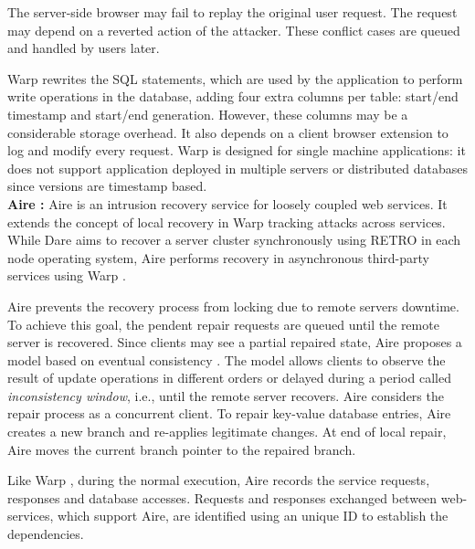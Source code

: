 The server-side browser may fail to replay the original user request. The request may depend on a reverted action of the attacker. These conflict cases are queued and handled by users later. 

Warp rewrites the \ac{SQL} statements, which are used by the application to perform write operations in the database, adding four extra columns per table: start/end timestamp and start/end generation. However, these columns may be a considerable storage overhead. It also depends on a client browser extension to log and modify every request. Warp is designed for single machine applications: it does not support application deployed in multiple servers or distributed databases since versions are timestamp based. \\


\textbf{Aire \cite{aire}:} Aire is an intrusion recovery service for loosely coupled web services. It extends the concept of local recovery in Warp \cite{warp} tracking attacks across services. While Dare \cite{dare} aims to recover a server cluster synchronously using RETRO \cite{retro} in each node operating system, Aire performs recovery in asynchronous third-party services using Warp \cite{warp}. 

Aire prevents the recovery process from locking due to remote servers downtime. To achieve this goal, the pendent repair requests are queued until the remote server is recovered. Since clients may see a partial repaired state, Aire proposes a model based on eventual consistency \cite{Decandia2007,Vogels2009}. The model allows clients to observe the result of update operations in different orders or delayed during a period called \textit{inconsistency window}, i.e., until the remote server recovers. Aire considers the repair process as a concurrent client. To repair key-value database entries, Aire creates a new branch \cite{git} and re-applies legitimate changes. At end of local repair, Aire moves the current branch pointer to the repaired branch.

Like Warp \cite{warp}, during the normal execution, Aire records the service requests, responses and database accesses. Requests and responses exchanged between web-services, which support Aire, are identified using an unique ID to establish the dependencies.


